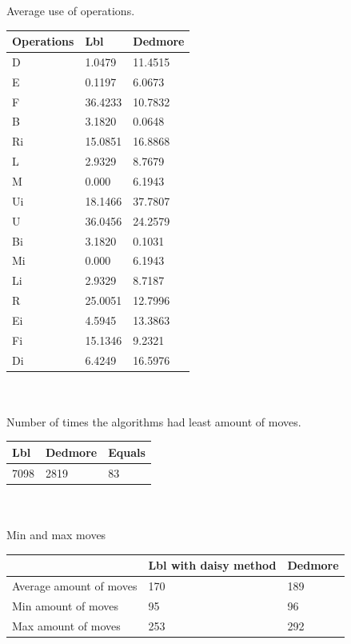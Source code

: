 \documentclass[a4paper,11pt]{kth-mag}
\begin{document}
		Average use of operations.\\
		\begin{tabular}{|l|l|l|}
		\hline
		Operations & Lbl & Dedmore \\ \hline
		D & 1.0479 & 11.4515 \\ \hline
		E & 0.1197 & 6.0673 \\ \hline
		F & 36.4233 & 10.7832 \\ \hline
		B & 3.1820 & 0.0648 \\ \hline
		Ri & 15.0851 & 16.8868 \\ \hline
		L & 2.9329 & 8.7679 \\ \hline
		M & 0.000 &	6.1943 \\ \hline
		Ui & 18.1466 & 37.7807 \\ \hline
		U & 36.0456 & 24.2579 \\ \hline
		Bi & 3.1820 & 0.1031 \\ \hline
		Mi & 0.000 & 6.1943 \\ \hline
		Li & 2.9329 & 8.7187 \\ \hline
		R & 25.0051 & 12.7996 \\ \hline
		Ei & 4.5945 & 13.3863 \\ \hline
		Fi & 15.1346 & 9.2321 \\ \hline
		Di & 6.4249 & 16.5976 \\ \hline
		\end{tabular}
		\\\\
		Number of times the algorithms had least amount of moves.\\
		\begin{tabular}{|l|l|l|}
		\hline
		Lbl & Dedmore & Equals \\ \hline
		7098 & 2819 & 83 \\ \hline
		\end{tabular}
		\\\\
		Min and max moves \\
		\begin{tabular}{|l|l|l|}
		\hline
		 & Lbl with daisy method & Dedmore \\ \hline
		Average amount of moves & 170 & 189 \\ \hline 
		Min amount of moves & 95 & 96 \\ \hline
		Max amount of moves & 253 & 292 \\ \hline
		\end{tabular}		

	
\end{document}
